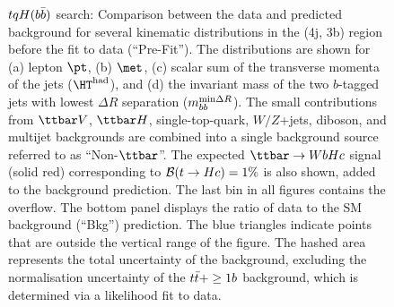 \begin{figure}[htbp]
\begin{center}
\caption{\small{$tqH(b\bar{b})$ search: Comparison between the data and predicted background for several kinematic 
distributions in the (4j, 3b) region before the fit to data (``Pre-Fit''). 
The distributions are shown for (a) lepton $\pt$, (b) $\met$, (c) scalar sum of the transverse momenta of 
the jets ($\hthad$), and (d) the invariant mass of the two $b$-tagged jets with lowest 
$\Delta R$ separation ($m_{bb}^{\textrm{min}\Delta R}$).
The small contributions from $\ttbar V$, $\ttbar H$, single-top-quark, $W/Z$+jets, diboson, and multijet backgrounds are combined 
into a single background source referred to as ``Non-$\ttbar$''. 
The expected $\Hc$ signal (solid red) corresponding to $\mathcal{B}(t\to Hc)=1\%$ is also shown,
added to the background prediction.
The last bin in all figures contains the overflow.
The bottom panel displays the ratio of data to the SM background (``Bkg'') prediction. 
The blue triangles indicate points that are outside the vertical range of the figure. 
The hashed area represents the total uncertainty of the background, excluding the normalisation uncertainty of the $t\bar{t}+\geq1b$ background, 
which is determined via a likelihood fit to data.}}
\label{fig:Hbb_extravars_4j3b}
\end{center}
\end{figure}


